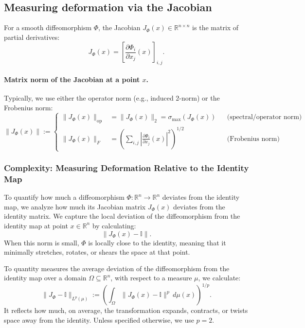\documentclass{article}
\theoremstyle{definition} \newtheorem{definition}{Definition}  \newtheorem{example}{Example}
\theoremstyle{remark} \newtheorem{remark}{Remark}
\newcounter{ct}
\begin{document}
\subsection{Measuring deformation via the Jacobian}\label{eq:jacobian_norm}
 For a smooth diffeomorphism \( \Phi \), the Jacobian \( J_{\Phi}(x) \in \mathbb{R}^{n \times n} \) is the matrix of partial derivatives:
\[
J_{\Phi}(x) = \left[ \frac{\partial \Phi_i}{\partial x_j}(x) \right]_{i,j}.
\]

\paragraph{Matrix norm of the Jacobian at a point \( x \).} Typically, we use either the operator norm (e.g., induced 2-norm) or the Frobenius norm:
\begin{equation}
\|J_{\Phi}(x)\| :=
\left\{
\begin{aligned}
\|J_{\Phi}(x)\|_{\mathrm{op}} &= \|J_{\Phi}(x)\|_2 = \sigma_{\max}(J_{\Phi}(x)) && \text{(spectral/operator norm)} \\
\|J_{\Phi}(x)\|_F &= \left( \sum_{i,j} \left| \frac{\partial \Phi_i}{\partial x_j}(x) \right|^2 \right)^{1/2} && \text{(Frobenius norm)}
\end{aligned}
\right.
\end{equation}


\subsubsection{Complexity: Measuring Deformation Relative to the Identity Map}\label{sec:complexity}
To quantify how much a diffeomorphism \( \Phi: \mathbb{R}^n \to \mathbb{R}^n \) deviates from the identity map, we analyze how much its Jacobian matrix \( J_{\Phi}(x) \) deviates from the identity matrix.
We capture the local deviation of the diffeomorphism from the identity map at point \( x \in \mathbb{R}^n \) by calculating:
\begin{equation}\label{eq:jac_id}
\|J_{\Phi}(x) - \mathbb{I}\|.
\end{equation}
When this norm is small, \( \Phi \) is locally close to the identity, meaning that it minimally stretches, rotates, or shears the space at that point.

To quantity measures the average deviation of the diffeomorphism from the identity map over a domain \( \Omega \subseteq \mathbb{R}^n \), with respect to a measure \( \mu \), we calculate: 
\[
\|J_{\Phi} - \mathbb{I}\|_{L^p(\mu)} := \left( \int_{\Omega} \|J_{\Phi}(x) - \mathbb{I}\|^p \, d\mu(x) \right)^{1/p}.
\]
 It reflects how much, on average, the transformation expands, contracts, or twists space away from the identity. 
 Unless specified otherwise, we use $p=2$.
\end{document}

